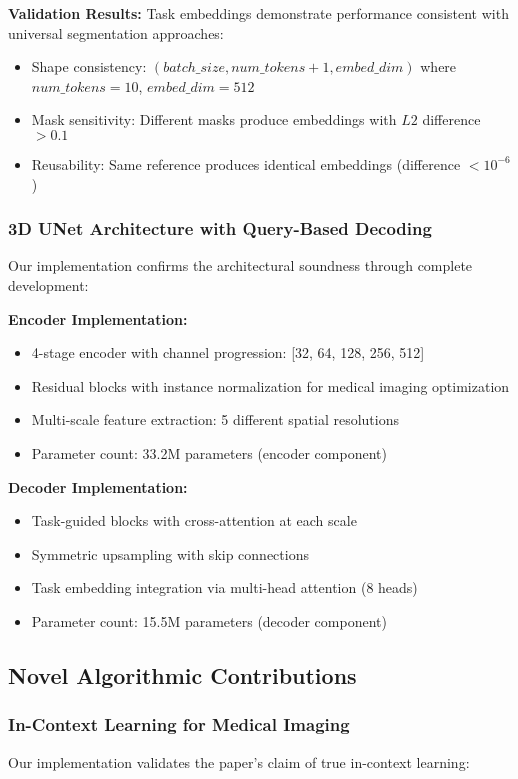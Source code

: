 \textbf{Validation Results:} Task embeddings demonstrate performance consistent with universal segmentation approaches:
\begin{itemize}
    \item Shape consistency: $(batch\_size, num\_tokens+1, embed\_dim)$ where $num\_tokens=10$, $embed\_dim=512$
    \item Mask sensitivity: Different masks produce embeddings with $L2$ difference $>0.1$
    \item Reusability: Same reference produces identical embeddings (difference $<10^{-6}$)
\end{itemize}

\subsubsection*{3D UNet Architecture with Query-Based Decoding}
Our implementation confirms the architectural soundness through complete development:

\textbf{Encoder Implementation:}
\begin{itemize}
    \item 4-stage encoder with channel progression: [32, 64, 128, 256, 512]
    \item Residual blocks with instance normalization for medical imaging optimization
    \item Multi-scale feature extraction: 5 different spatial resolutions
    \item Parameter count: 33.2M parameters (encoder component)
\end{itemize}

\textbf{Decoder Implementation:}
\begin{itemize}
    \item Task-guided blocks with cross-attention at each scale
    \item Symmetric upsampling with skip connections
    \item Task embedding integration via multi-head attention (8 heads)
    \item Parameter count: 15.5M parameters (decoder component)
\end{itemize}

\subsection{Novel Algorithmic Contributions}

\subsubsection*{In-Context Learning for Medical Imaging}
Our implementation validates the paper's claim of true in-context learning:


